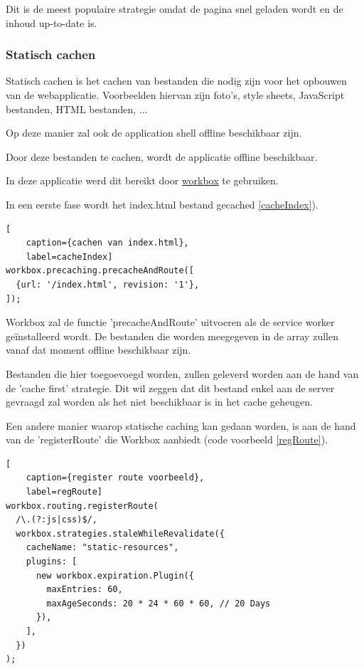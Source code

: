 				Dit is de meest populaire strategie omdat de pagina snel geladen wordt en de inhoud up-to-date is.

		\subsubsection{Statisch cachen}
			Statisch cachen is het cachen van bestanden die nodig zijn voor het opbouwen van de webapplicatie. Voorbeelden hiervan zijn foto's, style sheets, JavaScript bestanden, HTML bestanden, ...
			
			Op deze manier zal ook de application shell offline beschikbaar zijn.
			
			Door deze bestanden te cachen, wordt de applicatie offline beschikbaar.
			
			In deze applicatie werd dit bereikt door \href{https://developers.google.com/web/tools/workbox}{workbox} te gebruiken.
			
			In een eerste fase wordt het index.html bestand gecached \ref{cacheIndex}).

\begin{lstlisting}[
	caption={cachen van index.html},
	label=cacheIndex]
workbox.precaching.precacheAndRoute([
  {url: '/index.html', revision: '1'},
]);
\end{lstlisting}
		
			Workbox zal de functie 'precacheAndRoute' uitvoeren als de service worker geïnstalleerd wordt. De bestanden die worden meegegeven in de array zullen vanaf dat moment offline beschikbaar zijn.
			\autocite{Workbox2020a}
			
			Bestanden die hier toegoevoegd worden, zullen geleverd worden aan de hand van de 'cache first' strategie. Dit wil zeggen dat dit bestand enkel aan de server gevraagd zal worden als het niet beschikbaar is in het cache geheugen.
			
			Een andere manier waarop statische caching kan gedaan worden, is aan de hand van de 'registerRoute' die Workbox aanbiedt (code voorbeeld \ref{regRoute}). 
			
\begin{lstlisting}[
	caption={register route voorbeeld},
	label=regRoute]
workbox.routing.registerRoute(
  /\.(?:js|css)$/,
  workbox.strategies.staleWhileRevalidate({
    cacheName: "static-resources",
    plugins: [
      new workbox.expiration.Plugin({
        maxEntries: 60,
        maxAgeSeconds: 20 * 24 * 60 * 60, // 20 Days
      }),
    ],
  })
);
\end{lstlisting}
			
